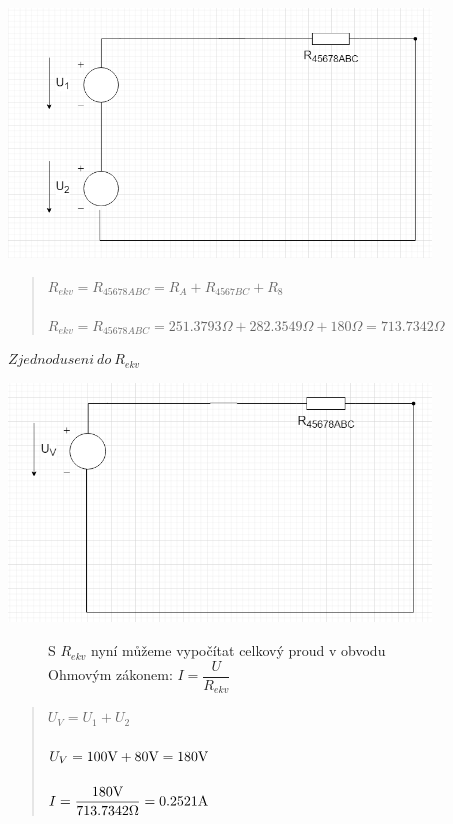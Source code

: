 \begin{figure}[H]
    \centering
    \includegraphics[scale=0.5]{picturesFor1Uloha/7.png}
    \caption{$ Zjednoduseni \: do \: R_{ekv}$}
    \label{fig:REKV}
    \begin{quote}
        \centering
        $R_{ekv} = R_{45678ABC} = R_A + R_{4567BC} + R_8$  \\~\\
        $R_{ekv} = R_{45678ABC} = 251.3793\Omega + 282.3549\Omega + 180\Omega = 713.7342 \Omega $  \\
    \end{quote}
\end{figure}
\begin{figure}[H]
    \centering
    \includegraphics[scale=0.5]{picturesFor1Uloha/8.png}
    \caption{Vyhledávání U a I}
    \label{fig:Volt_and_Amper_founding}
    \begin{figure}[H]
	S $R_{ekv}$ nyní můžeme vypočítat celkový proud v obvodu Ohmovým zákonem: $I = \dfrac{U}{R_{ekv}}$
    \end{figure}
    \begin{quote}
        \centering
        $U_V = U_1 + U_2$ \\~\\
        $U_V = 100\Vo + 80\Vo = 180\Vo$ \\~\\
        $I = \dfrac{180\Vo}{713.7342\Omega} = 0.2521\Am$
    \end{quote}
\end{figure}


